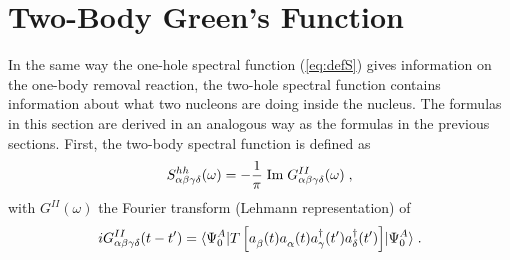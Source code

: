 \section{Two-Body Green's Function\label{sect:ppRPA}}
In the same way the one-hole spectral function (\ref{eq:defS}) gives 
information on the one-body removal reaction, the two-hole spectral
function contains 
information about what two nucleons are doing inside the nucleus. The formulas 
in this section are derived in an analogous way as the formulas in the 
previous sections.
First, the two-body spectral function is defined as
%
	\begin{equation}
		S^{hh}_{\alpha\beta\gamma\delta}(\omega)
	=
		-\frac{1}{\pi} 
		\; 
		{\rm Im}
		\; 
		G^{II}_{\alpha\beta\gamma\delta}(\omega)
	\;,
	\end{equation}
%
with $G^{II}(\omega)$ the Fourier transform (Lehmann representation) of
%
	\begin{equation}
		iG^{II}_{\alpha\beta\gamma\delta} (t-t') 
	=
		\ME< \Psi^A_0 | 
		T \left[
		\Oa{\beta} (t) \Oa{\alpha}(t)
		\Oc{\gamma}(t')\Oc{\delta}(t')
		\right]
		|\Psi^A_0 >
	\label{eq:g2t}
	\;.
	\end{equation}
%

